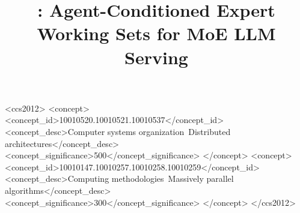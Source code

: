\documentclass[sigplan,10pt]{acmart}
\renewcommand\footnotetextcopyrightpermission[1]{}
\begin{document}
\title{\project: Agent-Conditioned Expert Working Sets for MoE LLM Serving}

\renewcommand\footnotetextcopyrightpermission[1]{}

\begin{abstract}

\end{abstract}

\begin{CCSXML}
<ccs2012>
  <concept>
    <concept_id>10010520.10010521.10010537</concept_id>
    <concept_desc>Computer systems organization~Distributed architectures</concept_desc>
    <concept_significance>500</concept_significance>
  </concept>
  <concept>
    <concept_id>10010147.10010257.10010258.10010259</concept_id>
    <concept_desc>Computing methodologies~Massively parallel algorithms</concept_desc>
    <concept_significance>300</concept_significance>
  </concept>
</ccs2012>
\end{CCSXML}



\maketitle











\end{document}
